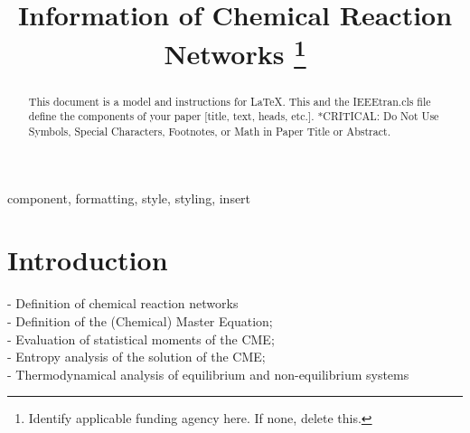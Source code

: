 \documentclass[conference]{IEEEtran}
\begin{document}
\title{Information of Chemical Reaction Networks
\thanks{Identify applicable funding agency here. If none, delete this.}
}

\author{
\and
{}
}

\maketitle

\begin{abstract}
This document is a model and instructions for \LaTeX.
This and the IEEEtran.cls file define the components of your paper [title, text, heads, etc.]. *CRITICAL: Do Not Use Symbols, Special Characters, Footnotes, 
or Math in Paper Title or Abstract.
\end{abstract}

\begin{IEEEkeywords}
component, formatting, style, styling, insert
\end{IEEEkeywords}

\section{Introduction}

\noindent - Definition of chemical reaction networks\\
- Definition of the (Chemical) Master Equation;\\
- Evaluation of statistical moments of the CME;\\
- Entropy analysis of the solution of the CME;\\
- Thermodynamical analysis of equilibrium and non-equilibrium systems \\
\end{document}
